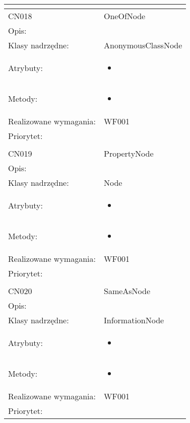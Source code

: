 \documentclass[a4paper,10pt]{article}
\begin{document}
\begin{center}
\begin{tabular}{|m{3cm}|m{9cm}|}
\multicolumn{2}{c}{} \\
 \hline

CN018 & OneOfNode \\ \hline
Opis: &     \\ \hline
Klasy nadrzędne: & AnonymousClassNode     \\ \hline
Atrybuty: & \begin{itemize}
 \item 
\end{itemize}
 \\ \hline
Metody: & \begin{itemize}
 \item 
\end{itemize}
  \\ \hline
Realizowane wymagania: & WF001 \\ \hline
Priorytet: &  \\ \hline

\multicolumn{2}{c}{} \\
 \hline

CN019 & PropertyNode \\ \hline
Opis: &     \\ \hline
Klasy nadrzędne: & Node     \\ \hline
Atrybuty: & \begin{itemize}
 \item 
\end{itemize}
 \\ \hline
Metody: & \begin{itemize}
 \item 
\end{itemize}
  \\ \hline
Realizowane wymagania: & WF001 \\ \hline
Priorytet: &  \\ \hline

\multicolumn{2}{c}{} \\
 \hline

CN020 & SameAsNode \\ \hline
Opis: &     \\ \hline
Klasy nadrzędne: & InformationNode     \\ \hline
Atrybuty: & \begin{itemize}
 \item 
\end{itemize}
 \\ \hline
Metody: & \begin{itemize}
 \item 
\end{itemize}
  \\ \hline
Realizowane wymagania: & WF001 \\ \hline
Priorytet: &  \\ \hline


\end{tabular}
\end{center}
\end{document}
